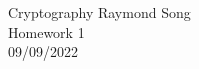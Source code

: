 \documentclass[12pt]{article}
\begin{document}
\noindent Cryptography \hfill  Raymond Song \\
Homework 1 \\
09/09/2022 \\
\end{document}
